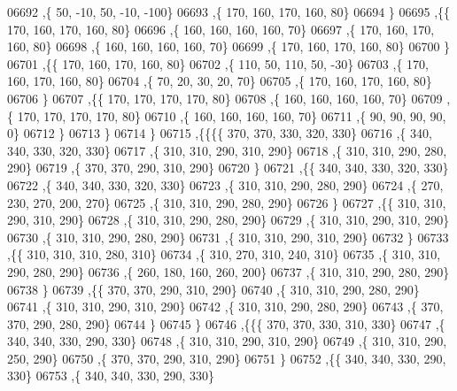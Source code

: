 \begin{DoxyCode}
06692     ,\{    50,   -10,    50,   -10,  -100\}
06693     ,\{   170,   160,   170,   160,    80\}
06694     \}
06695    ,\{\{   170,   160,   170,   160,    80\}
06696     ,\{   160,   160,   160,   160,    70\}
06697     ,\{   170,   160,   170,   160,    80\}
06698     ,\{   160,   160,   160,   160,    70\}
06699     ,\{   170,   160,   170,   160,    80\}
06700     \}
06701    ,\{\{   170,   160,   170,   160,    80\}
06702     ,\{   110,    50,   110,    50,   -30\}
06703     ,\{   170,   160,   170,   160,    80\}
06704     ,\{    70,    20,    30,    20,    70\}
06705     ,\{   170,   160,   170,   160,    80\}
06706     \}
06707    ,\{\{   170,   170,   170,   170,    80\}
06708     ,\{   160,   160,   160,   160,    70\}
06709     ,\{   170,   170,   170,   170,    80\}
06710     ,\{   160,   160,   160,   160,    70\}
06711     ,\{    90,    90,    90,    90,     0\}
06712     \}
06713    \}
06714   \}
06715  ,\{\{\{\{   370,   370,   330,   320,   330\}
06716     ,\{   340,   340,   330,   320,   330\}
06717     ,\{   310,   310,   290,   310,   290\}
06718     ,\{   310,   310,   290,   280,   290\}
06719     ,\{   370,   370,   290,   310,   290\}
06720     \}
06721    ,\{\{   340,   340,   330,   320,   330\}
06722     ,\{   340,   340,   330,   320,   330\}
06723     ,\{   310,   310,   290,   280,   290\}
06724     ,\{   270,   230,   270,   200,   270\}
06725     ,\{   310,   310,   290,   280,   290\}
06726     \}
06727    ,\{\{   310,   310,   290,   310,   290\}
06728     ,\{   310,   310,   290,   280,   290\}
06729     ,\{   310,   310,   290,   310,   290\}
06730     ,\{   310,   310,   290,   280,   290\}
06731     ,\{   310,   310,   290,   310,   290\}
06732     \}
06733    ,\{\{   310,   310,   310,   280,   310\}
06734     ,\{   310,   270,   310,   240,   310\}
06735     ,\{   310,   310,   290,   280,   290\}
06736     ,\{   260,   180,   160,   260,   200\}
06737     ,\{   310,   310,   290,   280,   290\}
06738     \}
06739    ,\{\{   370,   370,   290,   310,   290\}
06740     ,\{   310,   310,   290,   280,   290\}
06741     ,\{   310,   310,   290,   310,   290\}
06742     ,\{   310,   310,   290,   280,   290\}
06743     ,\{   370,   370,   290,   280,   290\}
06744     \}
06745    \}
06746   ,\{\{\{   370,   370,   330,   310,   330\}
06747     ,\{   340,   340,   330,   290,   330\}
06748     ,\{   310,   310,   290,   310,   290\}
06749     ,\{   310,   310,   290,   250,   290\}
06750     ,\{   370,   370,   290,   310,   290\}
06751     \}
06752    ,\{\{   340,   340,   330,   290,   330\}
06753     ,\{   340,   340,   330,   290,   330\}

\end{DoxyCode}
